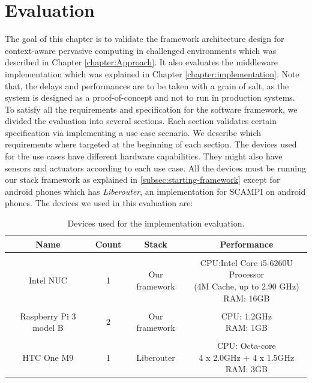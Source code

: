 
\chapter{Evaluation}\label{chapter:Evaluation}

The goal of this chapter is to validate the framework architecture design for context-aware pervasive computing in challenged environments which was described in Chapter \ref{chapter:Approach}. It also evaluates the middleware implementation which was explained in Chapter \ref{chapter:implementation}. Note that, the delays and performances are to be taken with a grain of salt, as the system is designed as a proof-of-concept and not to run in production systems. \\

\noindent To satisfy all the requirements and specification for the software framework, we divided the evaluation into several sections. Each section validates certain specification via implementing a use case scenario. We describe which requirements where targeted at the beginning of each section.
The devices used for  the use cases have different hardware capabilities. They might also have  sensors and actuators according to each use case. All the devices must be running our stack framework as explained in \ref{subsec:starting-framework} except for android phones which has \textit{Liberouter}, an implementation for SCAMPI on android phones. The devices we used in this evaluation are:
\begin{table}[!ht]
	\centering
	\begin{tabular}{*{4}{c}}\toprule
		Name & Count & Stack & Performance \\ \hline
		 &  &  &  \\
		Intel NUC &1& 	Our framework &   \specialcell[c]{CPU:Intel Core i5-6260U Processor\\ (4M Cache, up to 2.90 GHz)\\RAM: 16GB }\\ 
		&  &  &  \\
		Raspberry Pi 3 model B & 2 & Our framework &  \specialcell[c]{ CPU: 1.2GHz\\RAM: 1GB}  \\ 
		&  &  &  \\
		HTC One M9 & 1 & Liberouter &   \specialcell[c]{CPU: Octa-core \\4 x 2.0GHz + 4 x 1.5GHz\\ RAM: 3GB} \\ \hline

\end{tabular}
\caption{Devices used for the implementation evaluation.}
\label{table:devoces}
\end{table}

